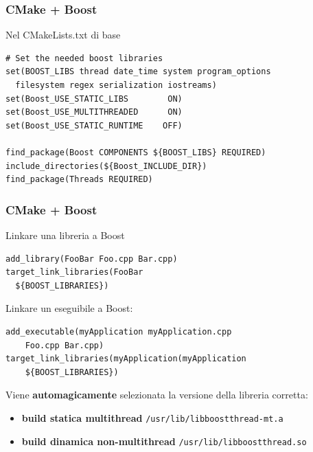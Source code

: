 \documentclass[10pt] {beamer}
\begin{document}
\begin{frame}[fragile]
 \frametitle{CMake + Boost}
Nel CMakeLists.txt di base
\begin{verbatim}
# Set the needed boost libraries 
set(BOOST_LIBS thread date_time system program_options 
  filesystem regex serialization iostreams)
set(Boost_USE_STATIC_LIBS        ON)
set(Boost_USE_MULTITHREADED      ON)
set(Boost_USE_STATIC_RUNTIME    OFF)

find_package(Boost COMPONENTS ${BOOST_LIBS} REQUIRED)
include_directories(${Boost_INCLUDE_DIR})
find_package(Threads REQUIRED)
\end{verbatim}

\end{frame}


\begin{frame}[fragile]
 \frametitle{CMake + Boost}
Linkare una libreria a Boost
\begin{verbatim}
add_library(FooBar Foo.cpp Bar.cpp)
target_link_libraries(FooBar 
  ${BOOST_LIBRARIES})
\end{verbatim}
Linkare un eseguibile a Boost:
\begin{verbatim}
add_executable(myApplication myApplication.cpp 
    Foo.cpp Bar.cpp)
target_link_libraries(myApplication(myApplication 
    ${BOOST_LIBRARIES})
\end{verbatim}
Viene \textbf{automagicamente} selezionata la versione della libreria corretta:
\begin{itemize}
\item \textbf{build statica multithread} \verb_/usr/lib/libboost_\verb_thread-mt.a_
\item \textbf{build dinamica non-multithread} \verb_/usr/lib/libboost_\verb_thread.so_
\end{itemize}
\end{frame}
\end{document}
